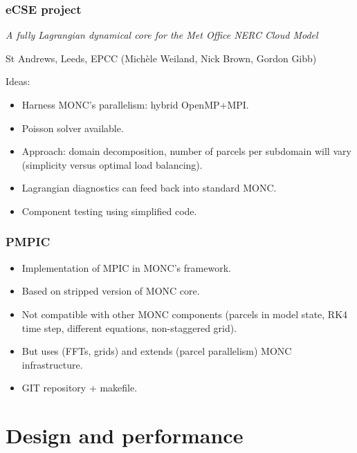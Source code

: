 \documentclass{beamer}
\def\gr#1{\color{dark_green} #1}
\def\re#1{\color{red}   #1}
\def\bl#1{\color{blue}  #1}
\def\pu#1{\color{purple} #1}
\begin{document}
\begin{frame}
\frametitle{eCSE project}
\textit{A fully Lagrangian dynamical core for the Met Office NERC Cloud Model}
\vspace{0.2cm}
\begin{center}
St Andrews, Leeds, EPCC (Mich\`ele Weiland, Nick Brown, Gordon Gibb)
\end{center}

\vspace{0.1cm}
Ideas:
\begin{itemize}
\item Harness {\gr MONC's parallelism}: hybrid OpenMP+MPI.
\item Poisson solver available.
\item Approach: {\bl domain decomposition}, number of parcels per subdomain will vary (simplicity versus optimal load balancing).
\item {\re Lagrangian diagnostics} can feed back into standard MONC.
\item {\pu Component testing} using simplified code.
\end{itemize}

\end{frame}

\begin{frame}
\frametitle{PMPIC}
\begin{itemize}
\item Implementation of MPIC in MONC's framework.
\item Based on stripped version of MONC core.
\item Not compatible with other MONC components (parcels in model state, RK4 time step, different equations, non-staggered grid).
\item But uses (FFTs, grids) and extends (parcel parallelism) MONC infrastructure.
\item GIT repository + makefile.
\end{itemize}
\end{frame}

\section{Design and performance}
\end{document}
